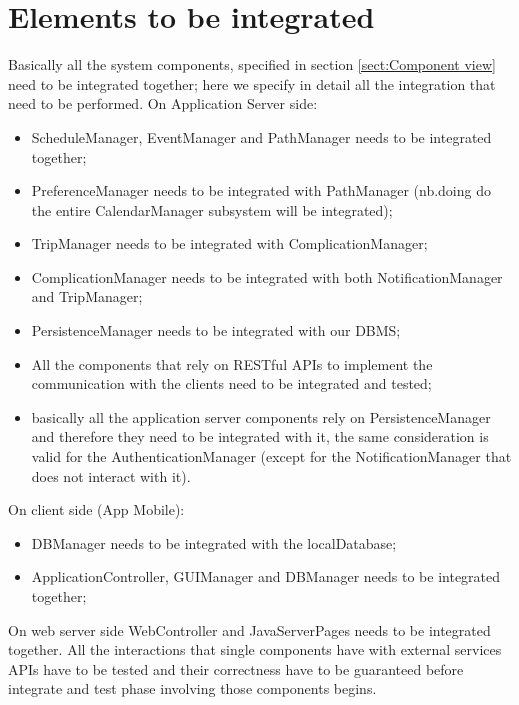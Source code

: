 \section{Elements to be integrated}
Basically all the system components, specified in section \ref{sect:Component view} need to be integrated together; here we specify in detail all the integration that need to be performed.
On Application Server side:
\begin{itemize}
	\item ScheduleManager, EventManager and PathManager needs to be integrated together;
	\item PreferenceManager needs to be integrated with PathManager (nb.doing do the entire CalendarManager subsystem will be integrated);
	\item TripManager needs to be integrated with ComplicationManager;
	\item ComplicationManager needs to be integrated with both NotificationManager and TripManager;
	\item PersistenceManager needs to be integrated with our DBMS;
	\item All the components that rely on RESTful APIs to implement the communication with the clients need to be integrated and tested;
	\item basically all the application server components rely on PersistenceManager and therefore they need to be integrated with it, the same consideration is valid for the AuthenticationManager (except for the NotificationManager that does not interact with it).
\end{itemize}
On client side (App Mobile):
\begin{itemize}
	\item DBManager needs to be integrated with the localDatabase;
	\item ApplicationController, GUIManager and DBManager needs to be integrated together;
\end{itemize}
On web server side WebController and JavaServerPages needs to be integrated together.
All the interactions that single components have with external services APIs have to be tested and their correctness have to be guaranteed before integrate and test phase involving those components begins.

